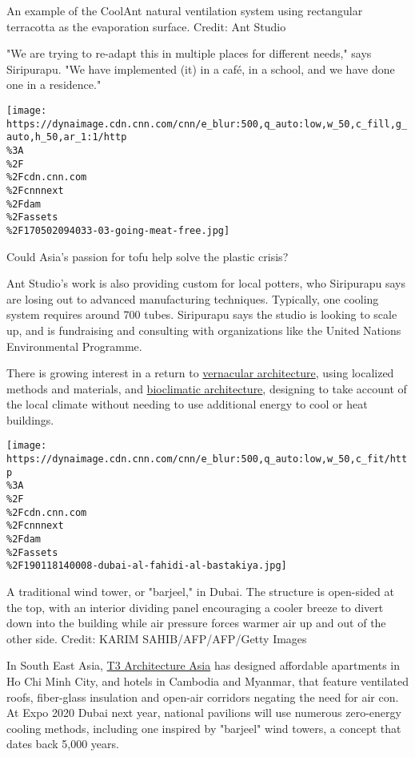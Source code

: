 An example of the CoolAnt natural ventilation system using rectangular
terracotta as the evaporation surface. Credit: Ant Studio

"We are trying to re-adapt this in multiple places for different needs,"
says Siripurapu. "We have implemented (it) in a café, in a school, and
we have done one in a residence."

\href{/2019/12/02/asia/soybeans-plastic-wrap-intl-hnk/index.html}{}

\texttt{[image: https://dynaimage.cdn.cnn.com/cnn/e\_blur:500,q\_auto:low,w\_50,c\_fill,g\_auto,h\_50,ar\_1:1/http\\\%3A\\\%2F\\\%2Fcdn.cnn.com\\\%2Fcnnnext\\\%2Fdam\\\%2Fassets\\\%2F170502094033-03-going-meat-free.jpg]}

Could Asia's passion for tofu help solve the plastic crisis?

Ant Studio's work is also providing custom for local potters, who
Siripurapu says are losing out to advanced manufacturing techniques.
Typically, one cooling system requires around 700 tubes. Siripurapu says
the studio is looking to scale up, and is fundraising and consulting
with organizations like the United Nations Environmental Programme.

There is growing interest in a return to
\href{https://cnn.com/style/article/vernacular-architecture-sustainability/index.html}{vernacular
architecture}, using localized methods and materials, and
\href{https://cnn.com/style/article/t3-architecture-asia-bioclimatic-architecture/index.html}{bioclimatic
architecture}, designing to take account of the local climate without
needing to use additional energy to cool or heat buildings.

\texttt{[image: https://dynaimage.cdn.cnn.com/cnn/e\_blur:500,q\_auto:low,w\_50,c\_fit/http\\\%3A\\\%2F\\\%2Fcdn.cnn.com\\\%2Fcnnnext\\\%2Fdam\\\%2Fassets\\\%2F190118140008-dubai-al-fahidi-al-bastakiya.jpg]}

A traditional wind tower, or "barjeel," in Dubai. The structure is
open-sided at the top, with an interior dividing panel encouraging a
cooler breeze to divert down into the building while air pressure forces
warmer air up and out of the other side. Credit: KARIM
SAHIB/AFP/AFP/Getty Images

In South East Asia,
\href{https://cnn.com/style/article/t3-architecture-asia-bioclimatic-architecture/index.html}{T3
Architecture Asia} has designed affordable apartments in Ho Chi Minh
City, and hotels in Cambodia and Myanmar, that feature ventilated roofs,
fiber-glass insulation and open-air corridors negating the need for air
con. At Expo 2020 Dubai next year, national pavilions will use numerous
zero-energy cooling methods, including one inspired by "barjeel" wind
towers, a concept that dates back 5,000 years.

